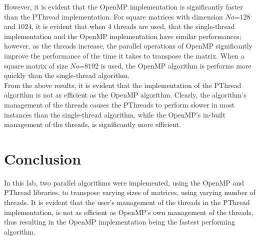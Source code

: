 \documentclass[journal, a4paper]{IEEEtran}
\begin{document}
 

However, it is evident that the OpenMP implementation is significantly faster than the PThread implementation. For square matrices with dimension $No$=$128$ and $1024$, it is evident that when 4 threads are used, that the single-thread implementation and the OpenMP implementation have similar performances; however, as the threads increase, the parallel operations of OpenMP significantly improve the performance of the time it takes to transpose the matrix. When a square matrix of size $No$=$8192$ is used, the OpenMP algorithm is performs more quickly than the single-thread algorithm. \\

From the above results, it is evident that the implementation of the PThread algorithm is not as efficient as the OpenMP algorithm. Clearly, the algorithm’s management of the threads causes the PThreads to perform slower in most instances than the single-thread algorithm, while the OpenMP’s in-built management of the threads, is significantly more efficient.


\section{Conclusion}
	

In this lab, two parallel algorithms were implemented, using the OpenMP and PThread libraries, to transpose varying sizes of matrices, using varying number of threads. It is evident that the user’s management of the threads in the PThread implementation, is not as efficient as OpenMP’s own management of the threads, thus resulting in the OpenMP implementation being the fastest performing algorithm.
\end{document}
